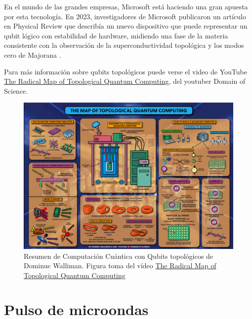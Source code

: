 En el mundo de las grandes empresas, Microsoft está haciendo una gran apuesta por esta tecnología. En 2023, investigadores de Microsoft publicaron un artículo en Physical Review que describía un nuevo dispositivo que puede representar un qubit lógico con estabilidad de hardware, midiendo una fase de la materia consistente con la observación de la superconductividad topológica y los modos cero de Majorana \cite{bib_hw_topological_microsoft}.

Para más información sobre qubits topológicos puede verse el video de YouTube \href{https://www.youtube.com/watch?v=ihZXl33t8So}{The Radical Map of Topological Quantum Computing}, del youtuber Domain of Science.

	\begin{figure}[H]
	\centering 
	\includegraphics[width=1\linewidth]{Figuras/Fig_hw_map_of_tqc.png}
	\caption{Resumen de Computación Cuántica con Qubits topológicos de Dominuc Walliman. Figura toma del vídeo \href{https://www.youtube.com/watch?v=ihZXl33t8So}{The Radical Map of Topological Quantum Computing}}
	\label{Fig_hw_map_of_tqc}
	\end{figure}




\section{Pulso de microondas}


